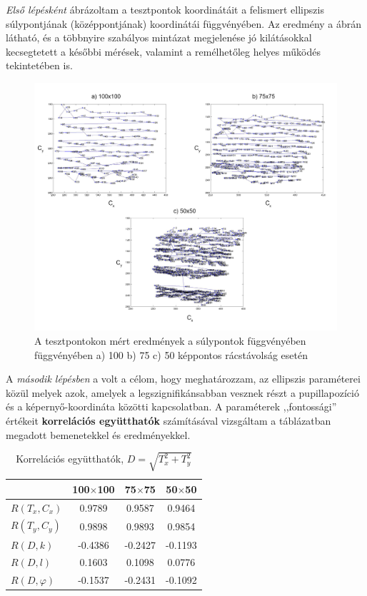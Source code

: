 \emph{Első lépésként} ábrázoltam a tesztpontok koordinátáit a felismert ellipszis súlypontjának (középpontjának)  koordinátái függvényében. Az eredmény a  ábrán látható, és a többnyire szabályos mintázat megjelenése jó kilátásokkal kecsegtetett a későbbi mérések, valamint a remélhetőleg helyes működés tekintetében is.

\begin{figure}[!ht]
\centering
\includegraphics[width=150mm, keepaspectratio]{figures/calib_coords.png}
\caption{A tesztpontokon mért eredmények a súlypontok függvényében függvényében a) 100 b) 75 c) 50 képpontos rácstávolság esetén}
\label{fig:calib_coords}
\end{figure}

A \emph{második lépésben} a volt a célom, hogy meghatározzam, az ellipszis paraméterei közül melyek azok, amelyek a legszignifikánsabban vesznek részt a pupillapozíció és a képernyő-koordináta közötti kapcsolatban. A paraméterek ,,fontossági'' értékeit \textbf{korrelációs együtthatók} számításával vizsgáltam a  táblázatban megadott bemenetekkel és eredményekkel. 

\begin{table}[ht]
	\centering
	\caption{Korrelációs együtthatók, $D = \sqrt{T_x^2+T_y^2}$} \label{tab:korrel}
	\begin{tabularx}{0.6\textwidth}{ l | S | S | S }
	 & \textbf{100$\times$100} & \textbf{75$\times$75} & \textbf{50$\times$50} \\ \hline \hline
	$R(T_x, C_x)$    & 0.9789    & 0.9587   & 0.9464 \\
	$R(T_y, C_y)$    & 0.9898    & 0.9893   & 0.9854 \\
	$R(D, k)$        & -0.4386   & -0.2427  & -0.1193 \\
	$R(D, l)$        & 0.1603    & 0.1098   & 0.0776 \\
	$R(D, \varphi)$  & -0.1537   & -0.2431  &  -0.1092 \\
	\end{tabularx}
\end{table}

